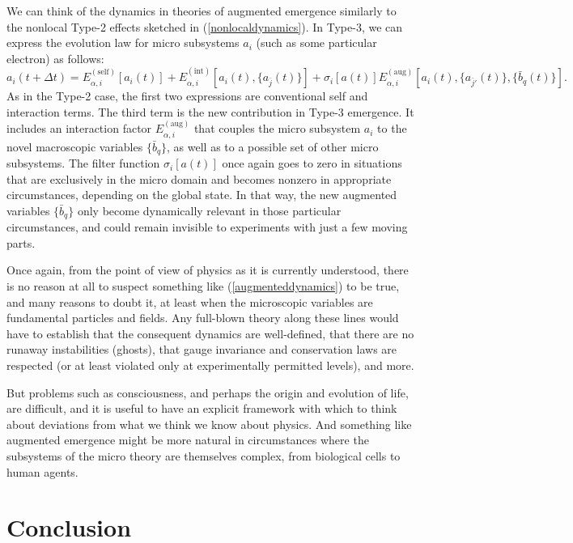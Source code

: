 \documentclass[12pt,english]{article}
\newcommand{\be}{\begin{equation}}
\newcommand{\ee}{\end{equation}}
\begin{document}
We can think of the dynamics in theories of augmented emergence similarly to the nonlocal Type-2 effects sketched in (\ref{nonlocaldynamics}).
In Type-3, we can express the evolution law for micro subsystems $a_i$ (such as some particular electron) as follows:
\be
  a_i(t+\Delta t) = E_{\alpha, i}^{(\mathrm{self})}[a_i(t)] 
  + E_{\alpha,i}^{(\mathrm{int})}[a_i(t), \{a_{\bar j}(t)\}] 
  + \sigma_i[a(t)] E_{\alpha,i}^{(\mathrm{aug})}[a_i(t), \{a_{\bar{j}'}(t)\}, \{\bar{b}_q(t)\}] .
  \label{augmenteddynamics}
\ee
As in the Type-2 case, the first two expressions are conventional self and interaction terms.
The third term is the new contribution in Type-3 emergence.
It includes an interaction factor $E_{\alpha,i}^{(\mathrm{aug})}$ that couples the micro subsystem $a_i$ to the novel macroscopic variables $\{\bar{b}_q\}$, as well as to a possible set of other micro subsystems.
The filter function $\sigma_i[a(t)]$ once again goes to zero in situations that are exclusively in the micro domain and becomes nonzero in appropriate circumstances, depending on the global state.
In that way, the new augmented variables $\{\bar{b}_q\}$ only become dynamically relevant in those particular circumstances, and could remain invisible to experiments with just a few moving parts.

Once again, from the point of view of physics as it is currently understood, there is no reason at all to suspect something like (\ref{augmenteddynamics}) to be true, and many reasons to doubt it, at least when the microscopic variables are fundamental particles and fields.
Any full-blown theory along these lines would have to establish that the consequent dynamics are well-defined, that there are no runaway instabilities (ghosts), that gauge invariance and conservation laws are respected (or at least violated only at experimentally permitted levels), and more.

But problems such as consciousness, and perhaps the origin and evolution of life, are difficult, and it is useful to have an explicit framework with which to think about deviations from what we think we know about physics.
And something like augmented emergence might be more natural in circumstances where the subsystems of the micro theory are themselves complex, from biological cells to human agents.

\section*{Conclusion}
\end{document}
